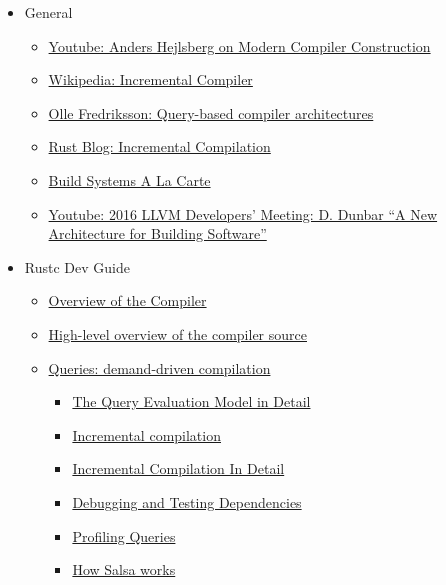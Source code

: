 \documentclass[12pt, a4paper]{report}
\begin{document}
\begin{itemize}[noitemsep]

\item General
  \begin{itemize}[noitemsep]
  \item \href{https://www.youtube.com/watch?v=wSdV1M7n4gQ}{\CheckedBox Youtube: Anders Hejlsberg on Modern Compiler Construction} \cite{hejlsberg_modern_compiler_construction}
  \item \href{https://en.wikipedia.org/wiki/Incremental_compiler}{\CheckedBox Wikipedia: Incremental Compiler} \cite{wiki_incremental_compiler}
  \item \href{https://ollef.github.io/blog/posts/query-based-compilers.html}{\CheckedBox Olle Fredriksson: Query-based compiler architectures} \cite{olle_query_based}
  \item \href{https://blog.rust-lang.org/2016/09/08/incremental.html}{\CheckedBox Rust Blog: Incremental Compilation} \cite{rust_blog_incremental_compilation}
  \item \href{https://www.microsoft.com/en-us/research/publication/build-systems-la-carte/}{\Square Build Systems A La Carte} \cite{mokhov2018build}
  \item \href{https://www.youtube.com/watch?v=b_T-eCToX1I}{\CheckedBox Youtube: 2016 LLVM Developers’ Meeting: D. Dunbar “A New Architecture for Building Software”} \cite{dunbar2016}
  \end{itemize}

\item Rustc Dev Guide
  \begin{itemize}[noitemsep]
  \item \href{https://rustc-dev-guide.rust-lang.org/overview.html}{\Square Overview of the Compiler}
  \item \href{https://rustc-dev-guide.rust-lang.org/compiler-src.html}{\Square High-level overview of the compiler source}
  \item \href{https://rustc-dev-guide.rust-lang.org/query.html}{\Square Queries: demand-driven compilation}
    \begin{itemize}[noitemsep]
    \item \href{https://rustc-dev-guide.rust-lang.org/queries/query-evaluation-model-in-detail.html}{\Square The Query Evaluation Model in Detail}
    \item \href{https://rustc-dev-guide.rust-lang.org/queries/incremental-compilation.html}{\Square Incremental compilation}
    \item \href{https://rustc-dev-guide.rust-lang.org/queries/incremental-compilation-in-detail.html}{\Square Incremental Compilation In Detail}
    \item \href{https://rustc-dev-guide.rust-lang.org/incrcomp-debugging.html}{\Square Debugging and Testing Dependencies}
    \item \href{https://rustc-dev-guide.rust-lang.org/queries/profiling.html}{\Square Profiling Queries}
    \item \href{https://rustc-dev-guide.rust-lang.org/salsa.html}{\Square How Salsa works}
    \end{itemize}
  \end{itemize}


\end{itemize}
\end{document}
